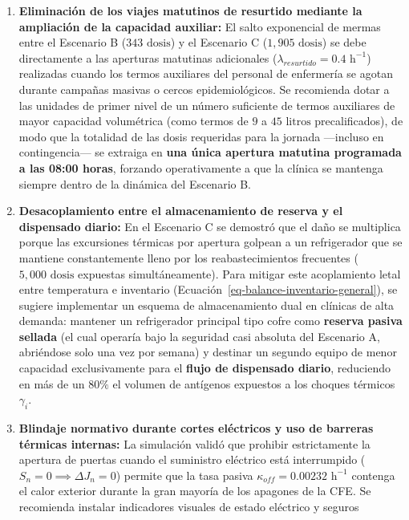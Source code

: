 \documentclass[
  spanish,
  letterpaper,
  DIV=11,
  numbers=noendperiod]{scrreprt}
\providecommand{\tightlist}{%
  \setlength{\itemsep}{0pt}\setlength{\parskip}{0pt}}
\theoremstyle{plain}
\theoremstyle{plain}
\theoremstyle{plain}
\theoremstyle{definition}
\theoremstyle{remark}
\begin{document}
\begin{enumerate}
\def\labelenumi{\arabic{enumi}.}
\tightlist
\item
  \textbf{Eliminación de los viajes matutinos de resurtido mediante la
  ampliación de la capacidad auxiliar:} El salto exponencial de mermas
  entre el Escenario B (\(343\text{ dosis}\)) y el Escenario C
  (\(1,905\text{ dosis}\)) se debe directamente a las aperturas
  matutinas adicionales (\(\lambda_{resurtido} = 0.4\text{ h}^{-1}\))
  realizadas cuando los termos auxiliares del personal de enfermería se
  agotan durante campañas masivas o cercos epidemiológicos. Se
  recomienda dotar a las unidades de primer nivel de un número
  suficiente de termos auxiliares de mayor capacidad volumétrica (como
  termos de \(9\) a \(45\text{ litros}\) precalificados), de modo que la
  totalidad de las dosis requeridas para la jornada ---incluso en
  contingencia--- se extraiga en \textbf{una única apertura matutina
  programada a las 08:00 horas}, forzando operativamente a que la
  clínica se mantenga siempre dentro de la dinámica del Escenario B.
\item
  \textbf{Desacoplamiento entre el almacenamiento de reserva y el
  dispensado diario:} En el Escenario C se demostró que el daño se
  multiplica porque las excursiones térmicas por apertura golpean a un
  refrigerador que se mantiene constantemente lleno por los
  reabastecimientos frecuentes (\(5,000\text{ dosis}\) expuestas
  simultáneamente). Para mitigar este acoplamiento letal entre
  temperatura e inventario
  (Ecuación~\ref{eq-balance-inventario-general}), se sugiere implementar
  un esquema de almacenamiento dual en clínicas de alta demanda:
  mantener un refrigerador principal tipo cofre como \textbf{reserva
  pasiva sellada} (el cual operaría bajo la seguridad casi absoluta del
  Escenario A, abriéndose solo una vez por semana) y destinar un segundo
  equipo de menor capacidad exclusivamente para el \textbf{flujo de
  dispensado diario}, reduciendo en más de un \(80\%\) el volumen de
  antígenos expuestos a los choques térmicos \(\gamma_i\).
\item
  \textbf{Blindaje normativo durante cortes eléctricos y uso de barreras
  térmicas internas:} La simulación validó que prohibir estrictamente la
  apertura de puertas cuando el suministro eléctrico está interrumpido
  (\(S_n = 0 \implies \Delta J_n = 0\)) permite que la tasa pasiva
  \(\kappa_{off} = 0.00232\text{ h}^{-1}\) contenga el calor exterior
  durante la gran mayoría de los apagones de la CFE. Se recomienda
  instalar indicadores visuales de estado eléctrico y seguros

\end{enumerate}
\end{document}
